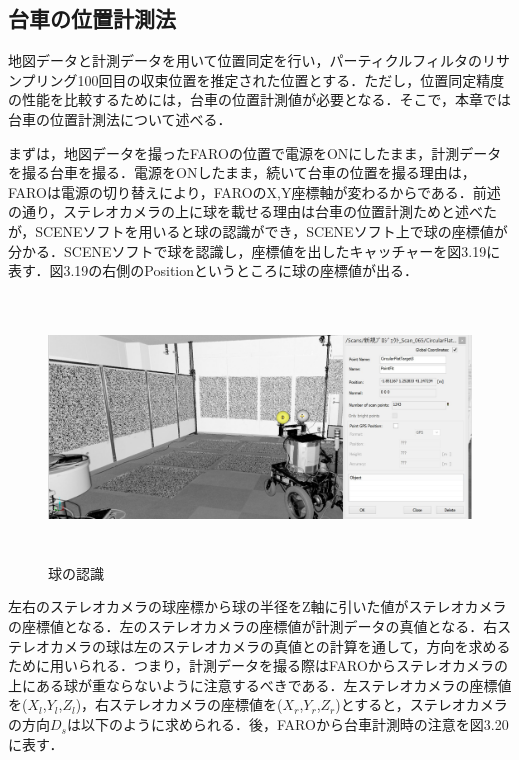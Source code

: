 \subsection{台車の位置計測法}

地図データと計測データを用いて位置同定を行い，パーティクルフィルタのリサンプリング100回目の収束位置を推定された位置とする．ただし，位置同定精度の性能を比較するためには，台車の位置計測値が必要となる．そこで，本章では台車の位置計測法について述べる．\par
まずは，地図データを撮ったFAROの位置で電源をONにしたまま，計測データを撮る台車を撮る．電源をONしたまま，続いて台車の位置を撮る理由は，FAROは電源の切り替えにより，FAROのX,Y座標軸が変わるからである．前述の通り，ステレオカメラの上に球を載せる理由は台車の位置計測ためと述べたが，SCENEソフトを用いると球の認識ができ，SCENEソフト上で球の座標値が分かる．SCENEソフトで球を認識し，座標値を出したキャッチャーを図3.19に表す．図3.19の右側のPositionというところに球の座標値が出る．

\begin{figure}[htbp]
  \begin{center}
   \includegraphics[height=70mm]{figure/球の認識.eps}
   \caption{球の認識}
   \label{球の認識}
  \end{center}
\end{figure}
\newpage

左右のステレオカメラの球座標から球の半径をZ軸に引いた値がステレオカメラの座標値となる．左のステレオカメラの座標値が計測データの真値となる．右ステレオカメラの球は左のステレオカメラの真値との計算を通して，方向を求めるために用いられる．つまり，計測データを撮る際はFAROからステレオカメラの上にある球が重ならないように注意するべきである．左ステレオカメラの座標値を($X_{l}$,$Y_{l}$,$Z_{l}$)，右ステレオカメラの座標値を($X_{r}$,$Y_{r}$,$Z_{r}$)とすると，ステレオカメラの方向$D_{s}$は以下のように求められる．後，FAROから台車計測時の注意を図3.20に表す．

